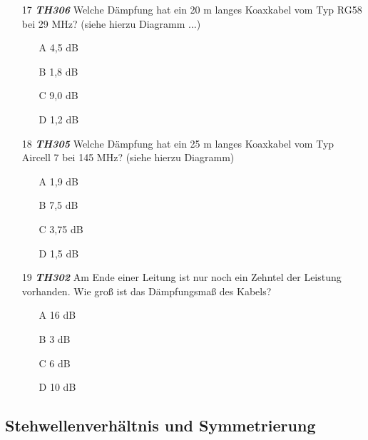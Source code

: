 \begin{enumerate} 
\itemsep1pt\parskip0pt
\item[17] \emph{\textbf{TH306}}  Welche Dämpfung hat ein 20 m langes Koaxkabel vom Typ RG58 bei 29 MHz? (siehe hierzu Diagramm ...)
	\begin{enumerate}
	\itemsep1pt\parskip0pt
		\item[A] 4,5 dB
		\item[B] 1,8 dB
		\item[C] 9,0 dB
		\item[D] 1,2 dB
	\end{enumerate}
\item[18] \emph{\textbf{TH305}}  Welche Dämpfung hat ein 25 m langes Koaxkabel vom Typ Aircell 7 bei 145 MHz? (siehe hierzu Diagramm)
	\begin{enumerate}
	\itemsep1pt\parskip0pt
		\item[A] 1,9 dB
		\item[B] 7,5 dB
		\item[C] 3,75 dB
		\item[D] 1,5 dB
	\end{enumerate}
\item[19] \emph{\textbf{TH302}}  Am Ende einer Leitung ist nur noch ein Zehntel der Leistung vorhanden. Wie groß ist das Dämpfungsmaß des Kabels?
	\begin{enumerate}
	\itemsep1pt\parskip0pt
		\item[A] 16 dB
		\item[B] 3 dB
		\item[C] 6 dB
		\item[D] 10 dB
	\end{enumerate}
\end{enumerate}

\subsection*{Stehwellenverhältnis und Symmetrierung}

